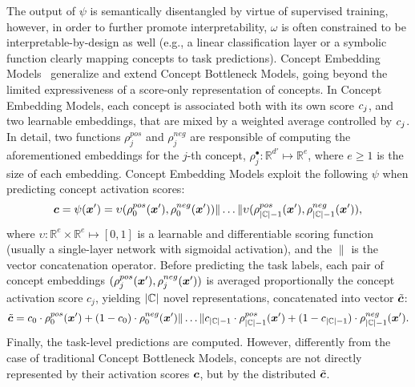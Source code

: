 The output of $\psi$ is semantically disentangled by virtue of supervised training, however, in order to further promote interpretability, $\omega$ is often constrained to be interpretable-by-design as well (e.g., a linear classification layer or a symbolic function clearly mapping concepts to task predictions).
%
Concept Embedding Models~\cite{espinosa2022concept} generalize and extend Concept Bottleneck Models, going beyond the limited expressiveness of a score-only representation of concepts.
In Concept Embedding Models, each concept is associated both with its own score ${c}_j$, and two learnable embeddings, that are mixed by a weighted average controlled by ${c}_j$. In detail, two functions $\rho^{pos}_j$ and $\rho^{neg}_j$ are responsible of computing the aforementioned embeddings for the $j$-th concept, $\rho^{\bullet}_j \colon \mathbb{R}^{d'} \mapsto \mathbb{R}^{e}$, where $e \geq 1$ is the size of each embedding. 
Concept Embedding Models exploit the following $\psi$ when predicting concept activation scores:
\begin{equation*}
	{\bm{c}} = \psi({\bm{x}}') = \upsilon(\rho_0^{pos}({\bm{x}}'), \rho_0^{neg}({\bm{x}}')) \| \ldots  \| \upsilon(\rho_{|{\mathbb{C}}|-1}^{pos}({\bm{x}}'), \rho_{|{\mathbb{C}}|-1}^{neg}({\bm{x}}')),
\end{equation*} 
where $\upsilon \colon \mathbb{R}^{e} \times \mathbb{R}^{e} \mapsto [0,1]$ is a learnable and differentiable scoring function (usually a single-layer network with sigmoidal activation), and the $\|$ is the vector concatenation operator. Before predicting the task labels, each pair of concept embeddings $(\rho_j^{pos}({\bm{x}}'),\rho_j^{neg}({\bm{x}}'))$ %
is averaged proportionally the concept activation score $c_j$, yielding $|{\mathbb{C}}|$ novel representations, concatenated into vector $\tilde{{\bm{c}}}$:
\begin{equation*}
	\tilde{{\bm{c}}} = {c}_0 \cdot \rho_0^{pos}({\bm{x}}') + (1 - {c}_0) \cdot \rho_0^{neg}({\bm{x}}') \| \dots \| {c}_{|{\mathbb{C}}|-1} \cdot \rho_{|{\mathbb{C}}|-1}^{pos}({\bm{x}}') + (1 - {c}_{|{\mathbb{C}}|-1}) \cdot \rho_{|{\mathbb{C}}|-1}^{neg}({\bm{x}}').
\end{equation*}
Finally, the task-level predictions are computed. However, differently from the case of traditional Concept Bottleneck Models, concepts are not directly represented by their activation scores ${\bm{c}}$, but by the distributed $\tilde{{\bm{c}}}$. %
